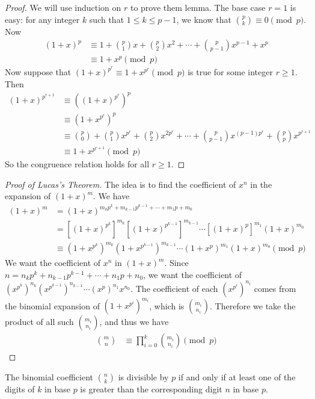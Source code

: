 \begin{proof}
	We will use induction on $r$ to prove them lemma. The base case $r=1$ is easy: for any integer $k$ such that $1 \leq k \leq p-1$, we know that $\binom{p}{k} \equiv 0 \pmod p$. Now
		\begin{align*}
			(1+x)^p
				& \equiv 1+\binom{p}{1}x+\binom{p}{2}x^2+\cdots+\binom{p}{p-1}x^{p-1}+x^p\\
				& \equiv 1+x^p\pmod p
		\end{align*}
	Now suppose that $(1+x)^{p^r}\equiv 1+x^{p^r}\pmod{p}$ is true for some integer $r \geq 1$. Then
		\begin{align*}
			(1+x)^{p^{r+1}}
				&\equiv\left((1+x)^{p^r}\right)^p\\
				& \equiv\left(1+x^{p^r}\right)^p\\
				& \equiv\binom{p}{0}+\binom{p}{1}x^{p^r}+\binom{p}{2}x^{2p^r}+\cdots+\binom{p}{p-1}x^{(p-1)p^r}+\binom{p}{p}x^{p^{r+1}}\\
				& \equiv 1+x^{p^{r+1}}\pmod{p}
		\end{align*}
	So the congruence relation holds for all $r \geq 1$.
\end{proof}

\begin{proof}[Proof of Lucas's Theorem]
	The idea is to find the coefficient of $x^n$ in the expansion of $(1+x)^m$. We have
		\begin{align*}
			(1+x)^m
				&=(1+x)^{m_kp^k+m_{k-1}p^{k-1}+\cdots+m_1p+m_0}\\
				&=[(1+x)^{p^k}]^{m_k}[(1+x)^{p^{k-1}}]^{m_{k-1}}\cdots[(1+x)^p]^{m_1}(1+x)^{m_0}\\ &\equiv(1+x^{p^k})^{m_k}(1+x^{p^{k-1}})^{m_{k-1}}\cdots(1+x^p)^{m_1}(1+x)^{m_0}\pmod{p}
		\end{align*}
	We want the coefficient of $x^n$ in $(1+x)^m$. Since $n=n_kp^k+n_{k-1}p^{k-1}+\cdots +n_1p+n_0$, we want the coefficient of $(x^{p^{k}})^{n_{k}}(x^{p^{k-1}})^{n_{k-1}}\cdots (x^p)^{n_1}x^{n_0}$.
	The coefficient of each $(x^{p^{i}})^{n_{i}}$ comes from the binomial expansion of $(1+x^{p^i})^{m_i}$, which is $\binom{m_i}{n_i}$. Therefore we take the product of all such $\binom{m_i}{n_i}$, and thus we have
		\begin{align*}
			\binom{m}{n}
				& \equiv\prod_{i=0}^{k}\binom{m_i}{n_i}\pmod{p}
		\end{align*}
\end{proof}

\begin{corollary}\label{cor:binomdiv}
	The binomial coefficient $\binom{n}{k}$ is divisible by $p$ if and only if at least one of the digits of $k$ in base $p$ is greater than the corresponding digit $n$ in base $p$.
\end{corollary}

